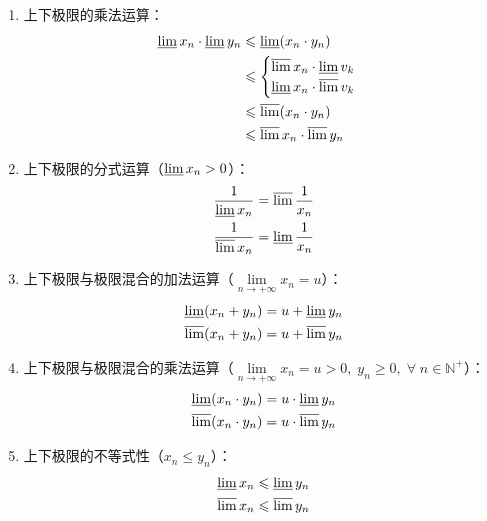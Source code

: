 \begin{property}
\begin{enumerate}
\begin{enumerate}
\begin{gather*}
				-\varliminf x_n=\varlimsup(-x_n) \\
				-\varlimsup x_n=\varliminf(-x_n)
			\end{gather*}
			\item 上下极限的乘法运算：
			\begin{align*}
				\varliminf x_n\cdot\varliminf y_n &\leqslant\varliminf(x_n\cdot y_n) \\
				&\leqslant
				\begin{cases}
					\varlimsup x_n\cdot\varliminf v_k \\
					\varliminf x_n\cdot\varlimsup v_k
				\end{cases} \\
				&\leqslant\varlimsup(x_n\cdot y_n) \\
				&\leqslant\varlimsup x_n\cdot\varlimsup y_n
			\end{align*}
			\item 上下极限的分式运算（$\varliminf x_n>0$）：
			\begin{gather*}
				\frac{1}{\varliminf x_n}=\varlimsup\frac{1}{x_n} \\
				\frac{1}{\varlimsup x_n}=\varliminf\frac{1}{x_n}
			\end{gather*}
			\item 上下极限与极限混合的加法运算（$\lim\limits_{n\to+\infty}x_n=u$）：
			\begin{gather*}
				\varliminf(x_n+y_n)=u+\varliminf y_n \\
				\varlimsup(x_n+y_n)=u+\varlimsup y_n
			\end{gather*}
			\item 上下极限与极限混合的乘法运算（$\lim\limits_{n\to+\infty}x_n=u>0,\;y_n\geqslant0,\;\forall\;n\in\mathbb{N}^+$）：
			\begin{gather*}
				\varliminf(x_n\cdot y_n)=u\cdot\varliminf y_n \\
				\varlimsup(x_n\cdot y_n)=u\cdot\varlimsup y_n
			\end{gather*}
			\item 上下极限的不等式性（$x_n\leqslant y_n$）：
			\begin{gather*}
				\varliminf x_n\leqslant\varliminf y_n \\
				\varlimsup x_n\leqslant\varlimsup y_n
			\end{gather*}
		\end{enumerate}
	\end{enumerate}
\end{property}
